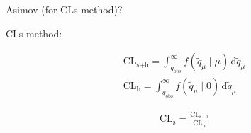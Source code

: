 Asimov (for CLs method)?

CLs method: \cite{Read:2002hq}

\begin{align}
  \text{CL}_\text{s+b} = \int^\infty_{q_\text{obs}} f(\tilde{q}_\mu \mid \mu) \, \mathrm{d}\tilde{q}_\mu \\
  \text{CL}_\text{b} = \int^\infty_{q_\text{obs}} f(\tilde{q}_\mu \mid 0) \, \mathrm{d}\tilde{q}_\mu
\end{align}


\begin{align}
  \text{CL}_\text{s} = \frac{\text{CL}_\text{s+b}}{\text{CL}_\text{b}}
\end{align}





